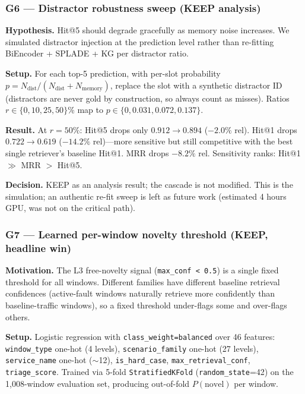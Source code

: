 \subsubsection{G6 --- Distractor robustness sweep (KEEP analysis)}

\textbf{Hypothesis.} Hit@5 should degrade gracefully as memory noise increases. We simulated distractor injection at the prediction level rather than re-fitting BiEncoder + SPLADE + KG per distractor ratio.

\textbf{Setup.} For each top-5 prediction, with per-slot probability $p = N_{\text{dist}} / (N_{\text{dist}} + N_{\text{memory}})$, replace the slot with a synthetic distractor ID (distractors are never gold by construction, so always count as misses). Ratios $r \in \{0, 10, 25, 50\}\%$ map to $p \in \{0, 0.031, 0.072, 0.137\}$.

\textbf{Result.} At $r = 50\%$: Hit@5 drops only $0.912 \to 0.894$ ($-2.0\%$ rel). Hit@1 drops $0.722 \to 0.619$ ($-14.2\%$ rel)---more sensitive but still competitive with the best single retriever's baseline Hit@1. MRR drops $-8.2\%$ rel. Sensitivity ranks: Hit@1 $\gg$ MRR $>$ Hit@5.

\textbf{Decision.} KEEP as an analysis result; the cascade is not modified. This is the simulation; an authentic re-fit sweep is left as future work (estimated 4 hours GPU, was not on the critical path).

\subsubsection{G7 --- Learned per-window novelty threshold (KEEP, headline win)}

\textbf{Motivation.} The L3 free-novelty signal (\texttt{max\_conf < 0.5}) is a single fixed threshold for all windows. Different families have different baseline retrieval confidences (active-fault windows naturally retrieve more confidently than baseline-traffic windows), so a fixed threshold under-flags some and over-flags others.

\textbf{Setup.} Logistic regression with \texttt{class\_weight=balanced} over 46 features: \texttt{window\_type} one-hot (4 levels), \texttt{scenario\_family} one-hot (27 levels), \texttt{service\_name} one-hot ($\sim$12), \texttt{is\_hard\_case}, \texttt{max\_retrieval\_conf}, \texttt{triage\_score}. Trained via 5-fold \texttt{StratifiedKFold} (\texttt{random\_state}=42) on the 1{,}008-window evaluation set, producing out-of-fold $P(\text{novel})$ per window.

